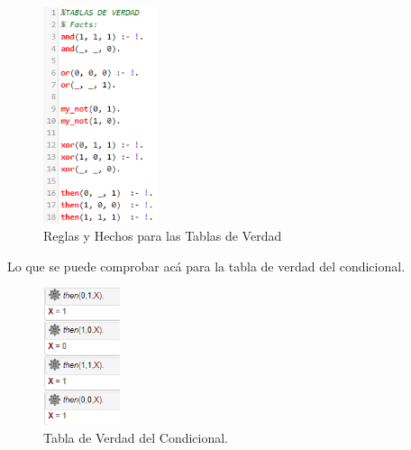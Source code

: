 \documentclass{article}
\begin{document}
\begin{enumerate}
\begin{figure}[H]
    \centering
    \includegraphics[width=0.3\textwidth]{code}
    \caption{Reglas y Hechos para las Tablas de Verdad}
    \label{referenciarImagenAca}
\end{figure}
Lo que se puede comprobar acá para la tabla de verdad del condicional.
\begin{figure}[H]
    \centering
    \includegraphics[width=0.2\textwidth]{prove}
    \caption{Tabla de Verdad del Condicional.}
    \label{referenciarImagenAca}
\end{figure}
  
\end{enumerate}
\end{document}
